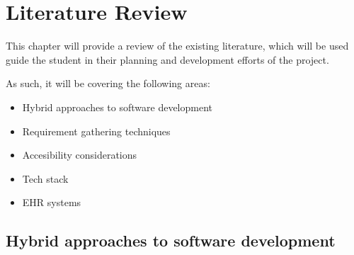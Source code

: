 \chapter{Literature Review}
\label{chap:lit_review}

This chapter will provide a review of the existing literature, which will be used guide the student in their planning and development efforts of the project.

\noindent As such, it will be covering the following areas:
\begin{itemize}
    \item Hybrid approaches to software development
    \item Requirement gathering techniques
    \item Accesibility considerations
    \item Tech stack
    \item EHR systems
\end{itemize}


\section{Hybrid approaches to software development}
